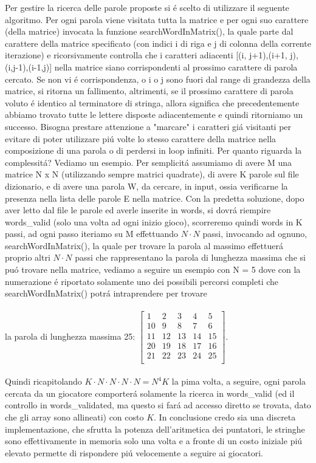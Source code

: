 Per gestire la ricerca delle parole proposte si \'e scelto di utilizzare il seguente algoritmo. Per ogni parola viene visitata tutta la matrice e per ogni suo carattere (della matrice) invocata la funzione searchWordInMatrix(), la quale parte dal carattere della matrice specificato (con indici i di riga e j di colonna della corrente iterazione) e ricorsivamente controlla che i caratteri adiacenti [(i, j+1),(i+1, j),(i,j-1),(i-1,j)] nella matrice siano corrispondenti al prossimo carattere di parola cercato. Se non vi \'e corrispondenza, o i o j sono fuori dal range di grandezza della matrice, si ritorna un fallimento, altrimenti, se il prossimo carattere di parola voluto \'e identico al terminatore di stringa, allora significa che precedentemente abbiamo trovato tutte le lettere disposte adiacentemente e quindi ritorniamo un successo. Bisogna prestare attenzione a "marcare" i caratteri gi\'a visitanti per evitare di poter utilizzare pi\'u volte lo stesso carattere della matrice nella composizione di una parola o di perdersi in loop infiniti. Per quanto riguarda la complessit\'a? Vediamo un esempio. Per semplicit\'a assumiamo di avere M una matrice N x N (utilizzando sempre matrici quadrate), di avere K parole sul file dizionario, e di avere una parola W, da cercare, in input, ossia verificarne la presenza nella lista delle parole E nella matrice. Con la predetta soluzione, dopo aver letto dal file le parole ed averle inserite in words, si dovr\'a riempire words\_valid (solo una volta ad ogni inizio gioco), scorreremo quindi words in K passi, ad ogni passo iteriamo su M effettuando $N \cdot N$ passi, invocando ad ognuno, searchWordInMatrix(), la quale per trovare la parola al massimo effettuer\'a proprio altri $N \cdot N$ passi che rappresentano la parola di lunghezza massima che si pu\'o trovare nella matrice, vediamo a seguire un esempio con N = 5 dove con la numerazione \'e riportato solamente uno dei possibili percorsi completi che searchWordInMatrix() potr\'a intraprendere per trovare\\\\ la parola di lunghezza massima 25:
$
\begin{bmatrix}
1 & 2 & 3 & 4 & 5\\
10 & 9 & 8 & 7 & 6\\
11 & 12 & 13 & 14 & 15\\
20 & 19 & 18 & 17 & 16\\
21 & 22 & 23 & 24 & 25\\
\end{bmatrix}
$.
\\
\\
Quindi ricapitolando $ K \cdot N \cdot N \cdot N \cdot N = N^4K $ la pima volta, a seguire, ogni parola cercata da un giocatore comporter\'a solamente la ricerca in words\_valid (ed il controllo in words\_validated, ma questo si far\'a ad accesso diretto se trovata, dato che gli array sono allineati) con costo $ K $. In conclusione credo sia una discreta implementazione, che sfrutta la potenza dell'aritmetica dei puntatori, le stringhe sono effettivamente in memoria solo una volta e a fronte di un costo iniziale pi\'u elevato permette di rispondere pi\'u velocemente a seguire ai giocatori.
\\

